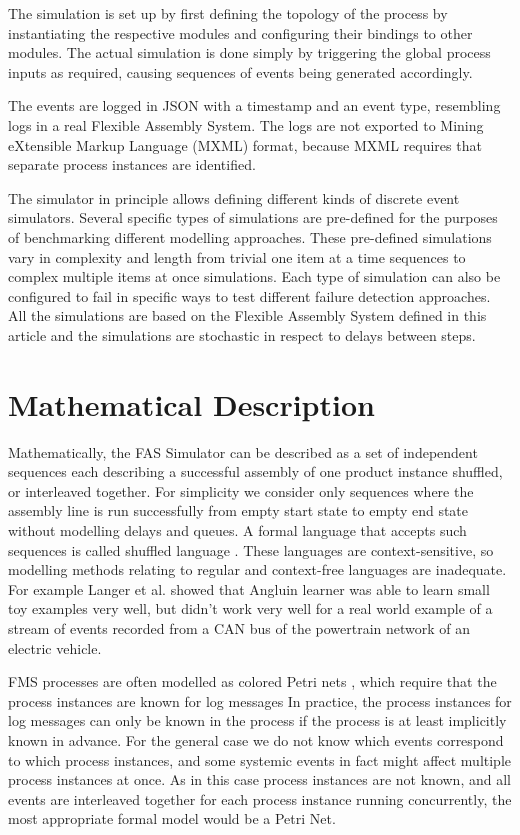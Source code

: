 \documentclass[journal]{IEEEtran}
\begin{document}
The simulation is set up by first defining the topology of the process by instantiating the respective modules and configuring their bindings to other modules. The actual simulation
is done simply by triggering the global process inputs as required, causing sequences of events being generated accordingly.

The events are logged in JSON with a timestamp and an event type, resembling logs in a real Flexible Assembly System. The logs are not exported to
Mining eXtensible Markup Language (MXML) format, because MXML requires that separate process instances are identified.

The simulator in principle allows defining different kinds of discrete event simulators. Several specific types of simulations are pre-defined for the purposes of benchmarking
different modelling approaches. These pre-defined simulations vary in complexity and length from trivial one item at a time sequences to complex multiple items at once simulations.
Each type of simulation can also be configured to fail in specific ways to test different failure detection approaches. All the simulations are based on the Flexible Assembly System
defined in this article and the simulations are stochastic in respect to delays between steps.

\section{Mathematical Description}

Mathematically, the FAS Simulator can be described as a set of independent sequences each describing a successful assembly of one product instance shuffled, or interleaved
together.
For simplicity we consider only sequences where the assembly line is run successfully from empty start state to empty end state without modelling delays and queues.
A formal language that accepts such sequences is called shuffled language \cite{berglund2011recognizing}. These languages are context-sensitive, so modelling methods
relating to regular and context-free languages are inadequate. For example Langer et al. \cite{langer2011self} showed that Angluin learner was able to learn small
toy examples very well, but didn't work very well for a real world example of a stream of events recorded from a CAN bus of the powertrain network of an electric vehicle.

FMS processes are often modelled as colored Petri nets \cite{saitou2002robust}, which require that the process instances are known for log messages
In practice, the process instances for log messages can only be known in the process
if the process is at least implicitly known in advance. For the general case we do not know which events correspond to which process instances, and some systemic events
in fact might affect multiple process instances at once. As in this
case process instances are not known, and all events are interleaved together for each process instance running concurrently, the most appropriate formal
model would be a Petri Net.
\end{document}
